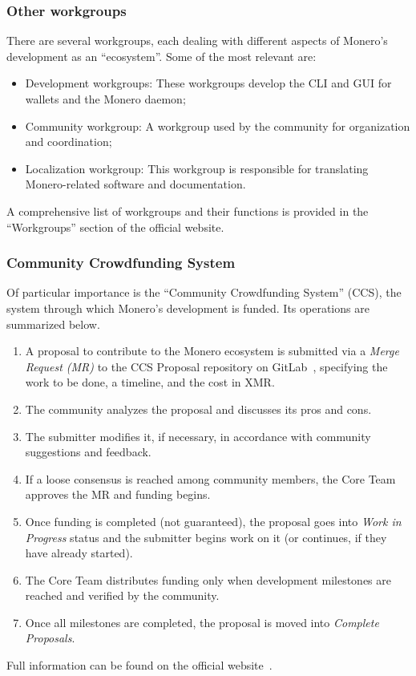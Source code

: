 \documentclass[conference]{IEEEtran}
\begin{document}
\subsubsection{Other workgroups}
There are several workgroups, each dealing with different aspects of Monero's development as an ``ecosystem''. Some of the most relevant are:
\begin{itemize}
    \item Development workgroups: These workgroups develop the CLI and GUI for wallets and the Monero daemon;
    \item Community workgroup: A workgroup used by the community for organization and coordination;
    \item Localization workgroup: This workgroup is responsible for translating Monero-related software and documentation.
\end{itemize}
A comprehensive list of workgroups and their functions is provided in the ``Workgroups'' section of the official website.~\cite{monero_workgroups}

\subsubsection{Community Crowdfunding System}
Of particular importance is the ``Community Crowdfunding System'' (CCS), the system through which Monero's development is funded. Its operations are summarized below.
\begin{enumerate}
    \item A proposal to contribute to the Monero ecosystem is submitted via a \textit{Merge Request (MR)} to the CCS Proposal repository on GitLab~\cite{ccs_repo_gitlab}, specifying the work to be done, a timeline, and the cost in XMR.
    \item The community analyzes the proposal and discusses its pros and cons.
    \item The submitter modifies it, if necessary, in accordance with community suggestions and feedback.
    \item If a loose consensus is reached among community members, the Core Team approves the MR and funding begins.
    \item Once funding is completed (not guaranteed), the proposal goes into \textit{Work in Progress} status and the submitter begins work on it (or continues, if they have already started).
    \item The Core Team distributes funding only when development milestones are reached and verified by the community.
    \item Once all milestones are completed, the proposal is moved into \textit{Complete Proposals}.
\end{enumerate}
Full information can be found on the official website~\cite{monero_ccs}.
\end{document}
